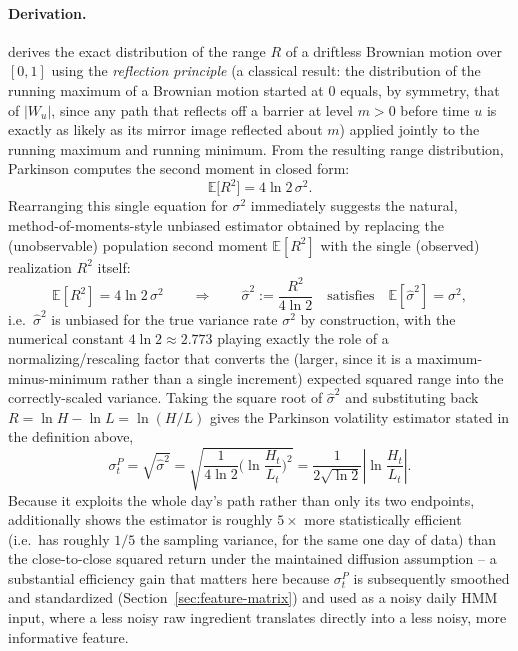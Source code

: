 \documentclass[11pt]{article}
\theoremstyle{definition}
\theoremstyle{remark}
\begin{document}
\paragraph{Derivation.} \cite{parkinson1980} derives the exact distribution of the range $R$ of a driftless Brownian motion over $[0,1]$ using the \emph{reflection principle} (a classical result: the distribution of the running maximum of a Brownian motion started at $0$ equals, by symmetry, that of $|W_u|$, since any path that reflects off a barrier at level $m>0$ before time $u$ is exactly as likely as its mirror image reflected about $m$) applied jointly to the running maximum and running minimum. From the resulting range distribution, Parkinson computes the second moment in closed form:
\[
\mathbb{E}\big[R^2\big] = 4\ln 2\,\sigma^2.
\]
Rearranging this single equation for $\sigma^2$ immediately suggests the natural, method-of-moments-style unbiased estimator obtained by replacing the (unobservable) population second moment $\mathbb{E}[R^2]$ with the single (observed) realization $R^2$ itself:
\[
\mathbb{E}[R^2]=4\ln2\,\sigma^2 \qquad\Longrightarrow\qquad \widehat{\sigma}^2 := \frac{R^2}{4\ln2} \quad\text{satisfies}\quad \mathbb{E}[\widehat\sigma^2]=\sigma^2,
\]
i.e.\ $\widehat\sigma^2$ is unbiased for the true variance rate $\sigma^2$ by construction, with the numerical constant $4\ln2\approx2.773$ playing exactly the role of a normalizing/rescaling factor that converts the (larger, since it is a maximum-minus-minimum rather than a single increment) expected squared range into the correctly-scaled variance. Taking the square root of $\widehat\sigma^2$ and substituting back $R=\ln H-\ln L=\ln(H/L)$ gives the Parkinson volatility estimator stated in the definition above,
\[
\sigma^P_t = \sqrt{\widehat\sigma^2} = \sqrt{\frac{1}{4\ln2}\Big(\ln\frac{H_t}{L_t}\Big)^2} = \frac{1}{2\sqrt{\ln2}}\left|\ln\frac{H_t}{L_t}\right|.
\]
Because it exploits the whole day's path rather than only its two endpoints, \cite{parkinson1980} additionally shows the estimator is roughly $5\times$ more statistically efficient (i.e.\ has roughly $1/5$ the sampling variance, for the same one day of data) than the close-to-close squared return under the maintained diffusion assumption -- a substantial efficiency gain that matters here because $\sigma^P_t$ is subsequently smoothed and standardized (Section~\ref{sec:feature-matrix}) and used as a noisy daily HMM input, where a less noisy raw ingredient translates directly into a less noisy, more informative feature.
\end{document}
